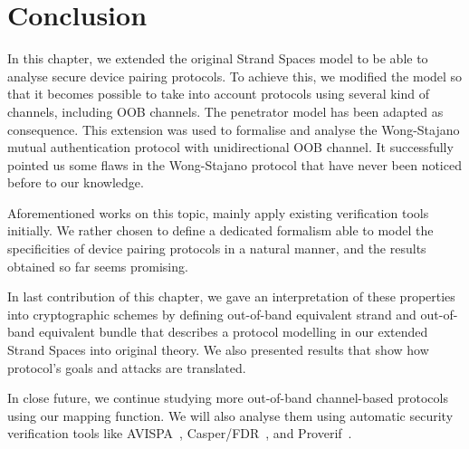 \section{Conclusion}

In this chapter, we extended the original Strand Spaces model to be able to analyse secure device pairing protocols. To achieve this, we modified the model so that it becomes possible to take into account protocols using several kind of channels, including OOB channels. The penetrator model has been adapted as consequence. This extension was used to formalise and analyse the Wong-Stajano mutual authentication protocol with unidirectional OOB channel. It successfully pointed us some flaws in the Wong-Stajano protocol that have never been noticed before to our knowledge. 
 
Aforementioned works on this topic, mainly apply existing verification tools initially. We rather chosen to define a dedicated formalism able to model the specificities of device pairing protocols in a natural manner, and the results obtained so far seems  promising. 

In last contribution of this chapter, we gave an interpretation of these properties into cryptographic schemes by defining out-of-band equivalent strand and out-of-band equivalent bundle that describes a protocol modelling in our extended Strand Spaces into original theory. We also presented results that show how protocol's goals and attacks are translated. 

In close future, we continue studying more out-of-band channel-based protocols using our mapping function. We will also analyse them using automatic security verification tools like AVISPA~\cite{Armando:2005:ATA:2153230.2153265}, Casper/FDR~\cite{596779}, and Proverif~\cite{Diaz2014149}. 
